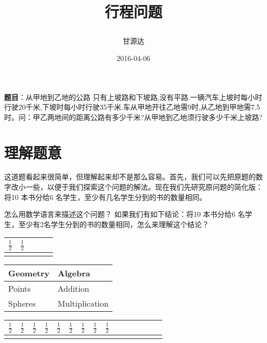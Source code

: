 \documentclass{article}      %
\title{\begin{CJK}{UTF8}{gkai}行程问题\end{CJK}}  %
\author{\begin{CJK}{UTF8}{gkai}甘源达\end{CJK}}      %
\date{2016-04-06}      %
\begin{document}

\maketitle                   %

\begin{CJK}{UTF8}{gkai}
\textbf{题目}：从甲地到乙地的公路 只有上坡路和下坡路,没有平路.一辆汽车上坡时每小时行驶20千米,下坡时每小时行驶35千米.车从甲地开往乙地需9时,从乙地到甲地需7.5时。问：甲乙两地间的距离公路有多少千米?从甲地到乙地须行驶多少千米上坡路?


\section{理解题意}      %

这道题看起来很简单，但理解起来却不是那么容易。首先，我们可以先把原题的数字改小一些，以便于我们探索这个问题的解法。现在我们先研究原问题的简化版：将10 本书分给6 名学生，至少有几名学生分到的书的数量相同。

怎么用数学语言来描述这个问题？ 如果我们有如下结论：将10 本书分给6 名学生，至少有2名学生分到的书的数量相同，怎么来理解这个结论？

\begin{tabular}{>{\centering}p{0.5cm}>{\centering}p{0.5cm}>{\centering}p{0.5cm}>{\centering}p{0.5cm}>{\centering}p{0.5cm}
}
\hline 
$\frac{1}{2}$ &$\frac{1}{2}$  &  &  & \tabularnewline
\hline 
 &  &  &  & \tabularnewline
\hline 
\end{tabular}

\begin{tabular}{>{\centering}p{3.5cm}|>{\centering}p{3.5cm} }
Geometry  & Algebra
\tabularnewline
\hline
 Points & Addition 
\tabularnewline
 Spheres & Multiplication 
\end{tabular}

\begin{tabular}{|>{\centering}p{0.5cm}|>{\centering}p{0.5cm}|>{\centering}p{0.5cm}|>{\centering}p{0.5cm}|>{\centering}p{0.5cm}|>{\centering}p{0.5cm}|>{\centering}p{0.5cm}|>{\centering}p{0.5cm}|>{\centering}p{0.5cm}|>{\centering}p{0.5cm}|>{\centering}p{0.5cm}|>{\centering}p{0.5cm}|>{\centering}p{0.5cm}|>{\centering}p{0.5cm}|>{\centering}p{0.5cm}|}
\hline 
 $\frac{1}{2}$ & $\frac{1}{2}$ & $\frac{1}{2}$ &$\frac{1}{2}$  & $\frac{1}{2}$ & $\frac{1}{2}$ & $\frac{1}{2}$ & $\frac{1}{2}$ & $\frac{1}{2}$ &  &  &  &  &  & \tabularnewline
\hline 
 &  &  &  &  &  &  &  &  &  &  &  &  &  & \tabularnewline
\hline 
\end{tabular}




\end{CJK}
\end{document}
